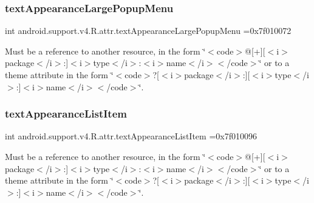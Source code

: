 \subsubsection{\texorpdfstring{text\+Appearance\+Large\+Popup\+Menu}{textAppearanceLargePopupMenu}}
{\footnotesize\ttfamily int android.\+support.\+v4.\+R.\+attr.\+text\+Appearance\+Large\+Popup\+Menu =0x7f010072\hspace{0.3cm}{\ttfamily [static]}}

Must be a reference to another resource, in the form \char`\"{}$<$code$>$@\mbox{[}+\mbox{]}\mbox{[}$<$i$>$package$<$/i$>$\+:\mbox{]}$<$i$>$type$<$/i$>$\+:$<$i$>$name$<$/i$>$$<$/code$>$\char`\"{} or to a theme attribute in the form \char`\"{}$<$code$>$?\mbox{[}$<$i$>$package$<$/i$>$\+:\mbox{]}\mbox{[}$<$i$>$type$<$/i$>$\+:\mbox{]}$<$i$>$name$<$/i$>$$<$/code$>$\char`\"{}. \mbox{\label{classandroid_1_1support_1_1v4_1_1R_1_1attr_aa6652e8f8f1055a205e3cf8a931aa2ef}} 
\subsubsection{\texorpdfstring{text\+Appearance\+List\+Item}{textAppearanceListItem}}
{\footnotesize\ttfamily int android.\+support.\+v4.\+R.\+attr.\+text\+Appearance\+List\+Item =0x7f010096\hspace{0.3cm}{\ttfamily [static]}}

Must be a reference to another resource, in the form \char`\"{}$<$code$>$@\mbox{[}+\mbox{]}\mbox{[}$<$i$>$package$<$/i$>$\+:\mbox{]}$<$i$>$type$<$/i$>$\+:$<$i$>$name$<$/i$>$$<$/code$>$\char`\"{} or to a theme attribute in the form \char`\"{}$<$code$>$?\mbox{[}$<$i$>$package$<$/i$>$\+:\mbox{]}\mbox{[}$<$i$>$type$<$/i$>$\+:\mbox{]}$<$i$>$name$<$/i$>$$<$/code$>$\char`\"{}. \mbox{\label{classandroid_1_1support_1_1v4_1_1R_1_1attr_a29c6c481b3ead94f36b0ffc18e7bc247}} 

